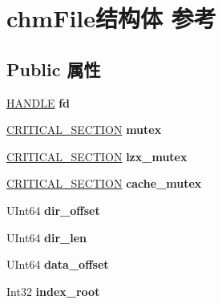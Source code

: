 \hypertarget{structchm_file}{}\section{chm\+File结构体 参考}
\label{structchm_file}
\subsection*{Public 属性}
\begin{DoxyCompactItemize}
\item 
\mbox{\label{structchm_file_a4d79a724054b50538801c62e7f395c25}} 
\hyperlink{interfacevoid}{H\+A\+N\+D\+LE} {\bfseries fd}
\item 
\mbox{\label{structchm_file_ad089df9e49523f1870da89c433c3a583}} 
\hyperlink{struct___c_r_i_t_i_c_a_l___s_e_c_t_i_o_n}{C\+R\+I\+T\+I\+C\+A\+L\+\_\+\+S\+E\+C\+T\+I\+ON} {\bfseries mutex}
\item 
\mbox{\label{structchm_file_ac3990b05f5aec60b82894062a9acc96a}} 
\hyperlink{struct___c_r_i_t_i_c_a_l___s_e_c_t_i_o_n}{C\+R\+I\+T\+I\+C\+A\+L\+\_\+\+S\+E\+C\+T\+I\+ON} {\bfseries lzx\+\_\+mutex}
\item 
\mbox{\label{structchm_file_a835875c96de7d33e007b7c14c41bc569}} 
\hyperlink{struct___c_r_i_t_i_c_a_l___s_e_c_t_i_o_n}{C\+R\+I\+T\+I\+C\+A\+L\+\_\+\+S\+E\+C\+T\+I\+ON} {\bfseries cache\+\_\+mutex}
\item 
\mbox{\label{structchm_file_a40f94e50bda1c8451ed0d4c905d24604}} 
U\+Int64 {\bfseries dir\+\_\+offset}
\item 
\mbox{\label{structchm_file_ae10946395abe2f4341ee42ffb8c51cd5}} 
U\+Int64 {\bfseries dir\+\_\+len}
\item 
\mbox{\label{structchm_file_ae4892407ff230d205fd425c889d037d1}} 
U\+Int64 {\bfseries data\+\_\+offset}
\item 
\mbox{\label{structchm_file_a36307315f37201e84dc451cf16c99d73}} 
Int32 {\bfseries index\+\_\+root}
\item 
\mbox{\label{structchm_file_ac68c75d117ff972b532427368ab99523}} 

\end{DoxyCompactItemize}
